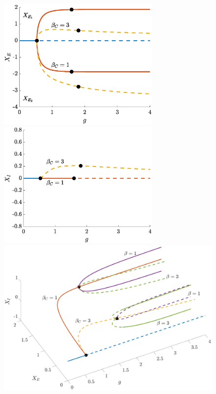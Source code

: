 \documentclass[reqno]{siamonline190516}
\begin{document}
\begin{figure}
    \centering
    \includegraphics[width=8cm]{images/bdclusters20c4E.eps} 
    \includegraphics[width=8cm]{images/bdclusters20c4I.eps} 
    \vspace{-0.5cm}
    \includegraphics[width=16cm]{images/bdclusters20c43D.eps} 

\end{figure}
\end{document}
